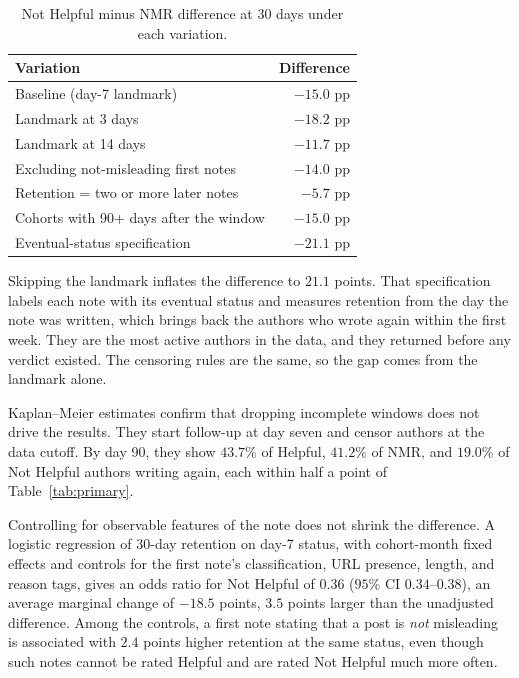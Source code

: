 \documentclass[sigconf,nonacm]{acmart}
\begin{document}
\begin{table}[t]
  \caption{Not Helpful minus NMR difference at 30 days under each variation.}
  \label{tab:robust}
  \begin{tabular}{lr}
    \toprule
    Variation & Difference \\
    \midrule
    Baseline (day-7 landmark)             & $-15.0$ pp \\
    Landmark at 3 days                    & $-18.2$ pp \\
    Landmark at 14 days                   & $-11.7$ pp \\
    Excluding not-misleading first notes  & $-14.0$ pp \\
    Retention = two or more later notes   & $-5.7$ pp \\
    Cohorts with 90+ days after the window& $-15.0$ pp \\
    \midrule
    Eventual-status specification         & $-21.1$ pp \\
    \bottomrule
  \end{tabular}
\end{table}

Skipping the landmark inflates the difference to $21.1$ points. That specification labels
each note with its eventual status and measures retention from the day the note was
written, which brings back the authors who wrote again within the first week. They are the
most active authors in the data, and they returned before any verdict existed. The censoring
rules are the same, so the gap comes from the landmark alone.

Kaplan--Meier estimates confirm that dropping incomplete windows does not drive the results.
They start follow-up at day seven and censor authors at the data cutoff. By day 90, they show
$43.7\%$ of Helpful, $41.2\%$ of NMR, and $19.0\%$ of Not Helpful authors writing again,
each within half a point of Table~\ref{tab:primary}.

Controlling for observable features of the note does not shrink the difference. A logistic
regression of 30-day retention on day-7 status, with cohort-month fixed effects and controls
for the first note's classification, URL presence, length, and reason tags, gives an odds
ratio for Not Helpful of $0.36$ ($95\%$ CI $0.34$--$0.38$), an average marginal change of
$-18.5$ points, $3.5$ points larger than the unadjusted difference. Among the controls, a first note stating
that a post is \emph{not} misleading is associated with $2.4$ points higher retention at the
same status, even though such notes cannot be rated Helpful and are rated Not Helpful much
more often.
\end{document}
